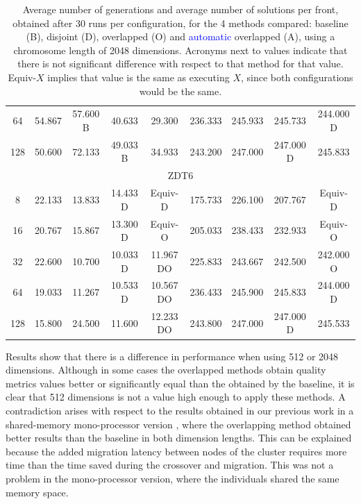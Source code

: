 \documentclass[preprint]{elsarticle}
\begin{document}
\begin{table}
{\begin{tabular}{|c||c|c|c|c||c|c|c|c||}
64	&	54.867		&	57.600	B	&	40.633			&	29.300			&	236.333		&	245.933			&	245.733			&	244.000	D			\\
128	&	50.600		&	72.133		&	49.033	B		&	34.933			&	243.200		&	247.000			&	247.000	D		&	245.833				\\ \hline
\multicolumn{9}{|c|}{ZDT6}																															\\ \hline
8	&	22.133		&	13.833		&	14.433	D		&	Equiv-D			&	175.733		&	226.100			&	207.767			&	Equiv-D				\\
16	&	20.767		&	15.867		&	13.300	D		&	Equiv-O			&	205.033		&	238.433			&	232.933			&	Equiv-O				\\
32	&	22.600		&	10.700		&	10.033	D		&	11.967	DO		&	225.833		&	243.667			&	242.500			&	242.000	O			\\
64	&	19.033		&	11.267		&	10.533	D		&	10.567	DO		&	236.433		&	245.900			&	245.833			&	244.000	D			\\
128	&	15.800		&	24.500		&	11.600			&	12.233	DO		&	243.800		&	247.000			&	247.000	D		&	245.533				\\ \hline
\end{tabular}
}
\caption{Average number of generations and average number of solutions per front, obtained after 30 runs per configuration, for the 4 methods compared: baseline (B), disjoint (D), overlapped (O) and \textcolor{blue}{automatic} overlapped (A), using a chromosome length of 2048 dimensions. Acronyms next to values indicate that there is not significant difference with respect to that method for that value. Equiv-$X$ implies that value is the same as executing $X$, since both configurations would be the same.}
\label{tab:sols2048}
\end{table}

Results show that there is a difference in performance when using 512 or 2048 dimensions. Although in some cases the overlapped methods obtain quality metrics values better or significantly equal than the obtained by the baseline, it is clear that 512 dimensions is not a value high enough to apply these methods. A contradiction arises with respect to the results obtained in our previous work in a shared-memory mono-processor version \citep{Garcia16hpmoon}, where the overlapping method obtained better results than the baseline in both dimension lengths. This can be explained because the added migration latency between nodes of the cluster requires more time than the time saved during the crossover and migration. This was not a problem in the mono-processor version, where the individuals shared the same memory space.
\end{document}
